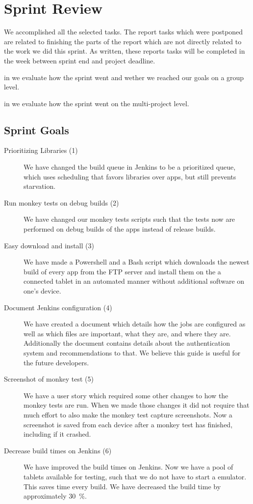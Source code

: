 \chapter{Sprint Review}\label{chap:sprint4_end}
 We accomplished all the selected tasks. The report tasks which were postponed are related to finishing the parts of the report which are not directly related to the work we did this sprint. As written, these reports tasks will be completed in the week between sprint end and project deadline.

\begin{chapterorganization}
    \item in  we evaluate how the sprint went and wether we reached our goals on a group level.
    \item in  we evaluate how the sprint went on the multi-project level.
\end{chapterorganization}

\section{Sprint Goals}\label{sec:s4_goals}
\begin{description}
    \item[Prioritizing Libraries (1)] We have changed the build queue in Jenkins to be a prioritized queue, which uses scheduling that favors libraries over apps, but still prevents starvation.
    \item[Run monkey tests on debug builds (2)] We have changed our monkey tests scripts such that the tests now are performed on debug builds of the apps instead of release builds.
    \item[Easy download and install (3)] We have made a Powershell and a Bash script which downloads the newest build of every app from the FTP server and install them on the a connected tablet in an automated manner without additional software on one's device.
    \item[Document Jenkins configuration (4)] We have created a document which details how the jobs are configured as well as which files are important, what they are, and where they are. Additionally the document contains details about the authentication system and recommendations to that. We believe this guide is useful for the future developers.
    \item[Screenshot of monkey test (5)] We have a user story which required some other changes to how the monkey tests are run. When we made those changes it did not require that much effort to also make the monkey test capture screenshots. Now a screenshot is saved from each device after a monkey test has finished, including if it crashed.
    \item[Decrease build times on Jenkins (6)] We have improved the build times on Jenkins. Now we have a pool of tablets available for testing, such that we do not have to start a emulator. This saves time every build. We have decreased the build time by approximately \SI{30}{\percent}.
\end{description}
